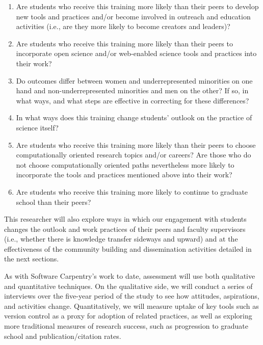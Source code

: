 \documentclass{proposalnsf}
\newlength{\up}
\begin{document}
\begin{enumerate}
\item
  Are students who receive this training more likely than their peers
  to develop new tools and practices and/or become involved in
  outreach and education activities (i.e., are they more likely to
  become creators and leaders)?

\item
  Are students who receive this training more likely than their peers
  to incorporate open science and/or web-enabled science tools and
  practices into their work?

\item
  Do outcomes differ between women and underrepresented minorities on
  one hand and non-underrepresented minorities and men on the other?
  If so, in what ways, and what steps are effective in correcting for
  these differences?

\item
  In what ways does this training change students' outlook on the
  practice of science itself?

\item
  Are students who receive this training more likely than their peers
  to choose computationally oriented research topics and/or careers?
  Are those who do not choose computationally oriented paths
  nevertheless more likely to incorporate the tools and practices
  mentioned above into their work?

\item
  Are students who receive this training more likely to continue to
  graduate school than their peers?

\end{enumerate}

This researcher will also explore ways in which our engagement with
students changes the outlook and work practices of their peers and
faculty supervisors (i.e., whether there is knowledge transfer
sideways and upward) and at the effectiveness of the community
building and dissemination activities detailed in the next sections. 

As with Software Carpentry's work to date,
assessment will use both qualitative and quantitative techniques.  On
the qualitative side, we will conduct a series of interviews over the
five-year period of the study to see how attitudes, aspirations, and
activities change. Quantitatively, we will measure uptake of key
tools such as version control as a proxy for adoption of related
practices, as well as exploring more traditional measures of research
success, such as progression to graduate school and
publication/citation rates. 
\end{document}
